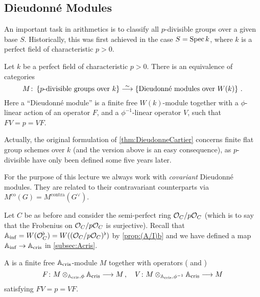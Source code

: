 \documentclass[a4paper, 10pt, oneside, DIV=9, chapterprefix=true, numbers=enddot,bibliography=totoc]{scrbook}
\begin{document}
\subsection{Dieudonné Modules}
An important task in arithmetics is to classify all $p$-divisible groups over a given base $S$. Historically, this was first achieved in the case $S=\operatorname{Spec} k$, where $k$ is a perfect field of characteristic $p>0$.
\begin{thm}\label{thm:DieudonneCartier}
	Let $k$ be a perfect field of characteristic $p>0$. There is an equivalence of categories
	\begin{equation*}
		M\colon \left\{p\text{-divisible groups over }k\right\}\isomorphism \left\{\text{Dieudonné modules over }W(k)\right\}\,.
	\end{equation*}
	Here a \enquote{Dieudonné module} is a finite free $W(k)$-module together with a $\phi$-linear action of an operator $F$, and a $\phi^{-1}$-linear operator $V$, such that $FV=p=VF$.
\end{thm}
\begin{rem}
	\begin{numerate}
		\item Actually, the original formulation of \cref{thm:DieudonneCartier} concerns finite flat group schemes over $k$ (and the version above is an easy consequence), as $p$-divisible have only been defined some five years later.
		\item For the purpose of this lecture we always work with \emph{covariant} Dieudonné modules. They are related to their contravariant counterparts via $M^{\mathrm{co}}(G)=M^{\mathrm{contra}}(G^\vee)$.
	\end{numerate}
\end{rem}
Let $C$ be as before and consider the semi-perfect ring $\mathcal{O}_C/p\mathcal{O}_C$ (which is to say that the Frobenius on $\mathcal{O}_C/p\mathcal{O}_C$ is surjective). Recall that $\mathbb{A}_{\mathrm{inf}} =W(\mathcal{O}_C^\flat)=W((\mathcal{O}_C/p\mathcal{O}_C)^\flat)$ by \cref{prop:(A/I)b} and we have defined  a map $\IA_\inf \morphism \IA_\cris$ in \cref{subsec:Acris}.
\begin{defi}
	A  is a finite free $\mathbb{A}_{\mathrm{cris}}$-module $M$ together with operators ( and )
	\begin{equation*}
		F\colon M\otimes_{\IA_\cris,\phi}\IA_\cris\morphism M\,,\quad V\colon M\otimes_{\IA_\cris,\phi^{-1}}\IA_\cris \morphism M
	\end{equation*}
	satisfying $FV=p=VF$.
\end{defi}
\end{document}
